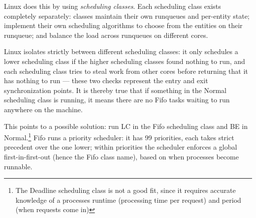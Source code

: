 Linux does this by using \textit{scheduling classes}. Each scheduling class
exists completely separately: classes maintain their own runqueues and
per-entity state; implement their own scheduling algorithms to choose from the
entities on their runqueue; and balance the load across runqueues on different
cores.

Linux isolates strictly between different scheduling classes: it only schedules
a lower scheduling class if the higher scheduling classes found nothing to run,
and each scheduling class tries to steal work from other cores before returning
that it has nothing to run --- these two checks represent the entry and exit
synchronization points. It is thereby true that if something in the Normal
scheduling class is running, it means there are no Fifo tasks waiting to run
anywhere on the machine.

This points to a possible solution: run LC in the Fifo scheduling class and BE
in Normal.\footnote{The Deadline scheduling class is not a good fit, since it
requires accurate knowledge of a processes runtime (processing time per request)
and period (when requests come in)} Fifo runs a priority scheduler: it has 99
priorities, each takes strict precedent over the one lower; within priorities
the scheduler enforces a global first-in-first-out (hence the Fifo class name),
based on when processes become runnable.


